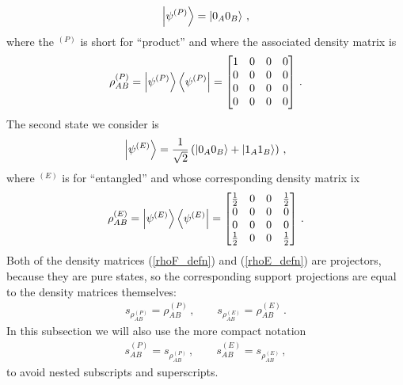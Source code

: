 \documentclass[12pt]{article}
\numberwithin{equation}{section}
\begin{document}
%
\begin{align}
    \ket{\psi^{(P)}} = \ket{ 0_A 0_B } \, ,
\end{align}
%
where the ${}^{(P)}$ is short for ``product'' and where the associated density matrix is
%
\begin{align}\label{rhoF_defn}
    \rho^{(P)}_{AB} = \ket{\psi^{(P)}} \bra{\psi^{(P)}} = \begin{bmatrix} 1 & 0 & 0 & 0 \\ 0 & 0 & 0 & 0 \\ 0 & 0 & 0 & 0 \\ 0 & 0 & 0 & 0 \end{bmatrix} \, .
\end{align}
%
The second state we consider is
%
\begin{align}
    \ket{\psi^{(E)}} = \frac{1}{\sqrt{2}} \left( \ket{0_A 0_B} + \ket{ 1_A 1_B } \right) \, ,
\end{align}
%
where ${}^{(E)}$ is for ``entangled'' and whose corresponding density matrix ix
%
\begin{align}\label{rhoE_defn}
    \rho_{AB}^{(E)} = \ket{\psi^{(E)}} \bra{\psi^{(E)}} = \begin{bmatrix} \frac{1}{2} & 0 & 0 & \frac{1}{2} \\ 0 & 0 & 0 & 0 \\ 0 & 0 & 0 & 0 \\ \frac{1}{2} & 0 & 0 & \frac{1}{2} \end{bmatrix} \, .
\end{align}
%
Both of the density matrices (\ref{rhoF_defn}) and (\ref{rhoE_defn}) are projectors, because they are pure states, so the corresponding support projections are equal to the density matrices themselves:
%
\begin{align}
    s_{\rho_{AB}^{(P)}} = \rho_{AB}^{(P)} \, , \qquad s_{\rho_{AB}^{(E)}} = \rho_{AB}^{(E)} \, .
\end{align}
%
In this subsection we will also use the more compact notation
%
\begin{align}
    s_{AB}^{(P)} = s_{\rho_{AB}^{(P)}} \, , \qquad s_{AB}^{(E)} = s_{\rho_{AB}^{(E)}} \, ,
\end{align}
%
to avoid nested subscripts and superscripts.
\end{document}

